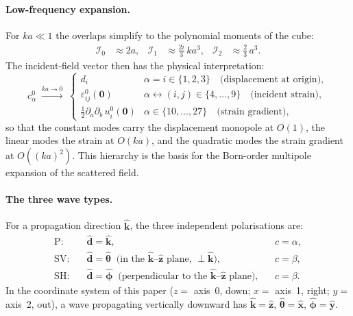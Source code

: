 \paragraph{Low-frequency expansion.}
For $ka \ll 1$ the overlaps simplify to the polynomial moments of the
cube:
\begin{align}
  \mathcal{I}_0 &\approx 2a, &
  \mathcal{I}_1 &\approx \tfrac{2i}{3}\,k a^3, &
  \mathcal{I}_2 &\approx \tfrac{2}{3}\,a^3.
  \label{eq:overlap-lowfreq}
\end{align}
The incident-field vector then has the physical interpretation:
\begin{equation}
  c^0_\alpha \;\xrightarrow{ka\to 0}\;
  \begin{cases}
    d_i                               & \alpha = i \in \{1,2,3\}
      \quad\text{(displacement at origin)},\\[4pt]
    \varepsilon^0_{ij}(\mathbf{0})    & \alpha \leftrightarrow (i,j) \in \{4,\ldots,9\}
      \quad\text{(incident strain)},\\[4pt]
    \tfrac{1}{2}\partial_a\partial_b\,u^0_i(\mathbf{0})
                                      & \alpha \in \{10,\ldots,27\}
      \quad\text{(strain gradient)},
  \end{cases}
  \label{eq:c0-lowfreq}
\end{equation}
so that the constant modes carry the displacement monopole at
$O(1)$, the linear modes the strain at $O(ka)$, and the
quadratic modes the strain gradient at $O((ka)^2)$.  This
hierarchy is the basis for the Born-order multipole expansion
of the scattered field.

\paragraph{The three wave types.}
For a propagation direction $\hat{\bm{k}}$, the three independent
polarisations are:
\begin{align}
  \text{P:}\quad  &\hat{\bm{d}} = \hat{\bm{k}},
    &&c = \alpha, \label{eq:P-wave}\\
  \text{SV:}\quad &\hat{\bm{d}} = \hat{\bm{\theta}}
    \;\;\text{(in the $\hat{\bm{k}}$--$\hat{\bm{z}}$ plane,
    $\perp\hat{\bm{k}}$)},
    &&c = \beta, \label{eq:SV-wave}\\
  \text{SH:}\quad &\hat{\bm{d}} = \hat{\bm{\phi}}
    \;\;\text{(perpendicular to the $\hat{\bm{k}}$--$\hat{\bm{z}}$ plane)},
    &&c = \beta. \label{eq:SH-wave}
\end{align}
In the coordinate system of this paper ($z = $ axis~0, down;
$x = $ axis~1, right; $y = $ axis~2, out), a wave propagating
vertically downward has $\hat{\bm{k}} = \hat{\bm{z}}$,
$\hat{\bm{\theta}} = \hat{\bm{x}}$,
$\hat{\bm{\phi}} = \hat{\bm{y}}$.

